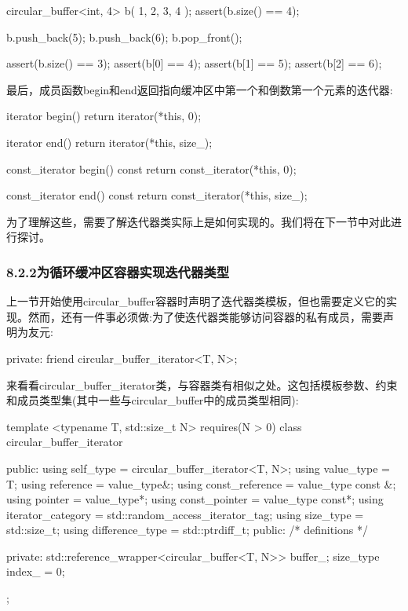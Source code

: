 \begin{cpp}
circular_buffer<int, 4> b({ 1, 2, 3, 4 });
assert(b.size() == 4);

b.push_back(5);
b.push_back(6);
b.pop_front();

assert(b.size() == 3);
assert(b[0] == 4);
assert(b[1] == 5);
assert(b[2] == 6);
\end{cpp}

最后，成员函数begin和end返回指向缓冲区中第一个和倒数第一个元素的迭代器:

\begin{cpp}
iterator begin()
{
	return iterator(*this, 0);
}

iterator end()
{
	return iterator(*this, size_);
}

const_iterator begin() const
{
	return const_iterator(*this, 0);
}

const_iterator end() const
{
	return const_iterator(*this, size_);
}
\end{cpp}

为了理解这些，需要了解迭代器类实际上是如何实现的。我们将在下一节中对此进行探讨。

\subsubsection{8.2.2\hspace{0.2cm}为循环缓冲区容器实现迭代器类型}

上一节开始使用circular\_buffer容器时声明了迭代器类模板，但也需要定义它的实现。然而，还有一件事必须做:为了使迭代器类能够访问容器的私有成员，需要声明为友元:

\begin{cpp}
private:
	friend circular_buffer_iterator<T, N>;
\end{cpp}

来看看circular\_buffer\_iterator类，与容器类有相似之处。这包括模板参数、约束和成员类型集(其中一些与circular\_buffer中的成员类型相同):

\begin{cpp}
template <typename T, std::size_t N>
requires(N > 0)
class circular_buffer_iterator
{
public:
	using self_type = circular_buffer_iterator<T, N>;
	using value_type = T;
	using reference = value_type&;
	using const_reference = value_type const &;
	using pointer = value_type*;
	using const_pointer = value_type const*;
	using iterator_category =
		std::random_access_iterator_tag;
	using size_type = std::size_t;
	using difference_type = std::ptrdiff_t;
public:
	/* definitions */
	
private:
	std::reference_wrapper<circular_buffer<T, N>> buffer_;
	size_type index_ = 0;
};
\end{cpp}

